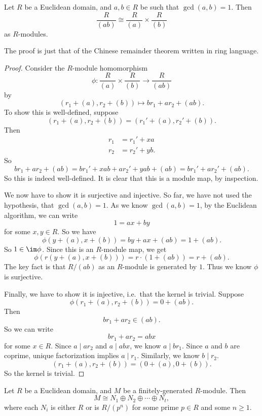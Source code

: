 \documentclass[a4paper]{article}
\begin{document}
\begin{lemma}
  Let $R$ be a Euclidean domain, and $a, b \in R$ be such that $\gcd(a, b) = 1$. Then
  \[
    \frac{R}{(ab)} \cong \frac{R}{(a)} \times \frac{R}{(b)}
  \]
  as $R$-modules.
\end{lemma}
The proof is just that of the Chinese remainder theorem written in ring language.
\begin{proof}
  Consider the $R$-module homomorphism
  \[
    \phi: \frac{R}{(a)} \times \frac{R}{(b)} \to \frac{R}{(ab)}
  \]
  by
  \[
    (r_1 + (a), r_2 + (b)) \mapsto br_1 + ar_2 + (ab).
  \]
  To show this is well-defined, suppose
  \[
    (r_1 + (a), r_2 + (b)) = (r_1' + (a), r_2' + (b)).
  \]
  Then
  \begin{align*}
    r_1 &= r_1' + xa\\
    r_2 &= r_2' + yb.
  \end{align*}
  So
  \[
    br_1 + ar_2 + (ab) = br_1' + x ab + a r_2' + yab + (ab) = br_1' + ar_2' + (ab).
  \]
  So this is indeed well-defined. It is clear that this is a module map, by inspection.

  We now have to show it is surjective and injective. So far, we have not used the hypothesis, that $\gcd(a, b) = 1$. As we know $\gcd(a, b) = 1$, by the Euclidean algorithm, we can write
  \[
    1 = ax + by
  \]
  for some $x, y \in R$. So we have
  \[
    \phi(y + (a), x + (b)) = by + ax + (ab) = 1 + (ab).
  \]
  So $1 \in \im \phi$. Since this is an $R$-module map, we get
  \[
    \phi(r (y + (a), x + (b))) = r \cdot (1 + (ab)) = r + (ab).
  \]
  The key fact is that $R/(ab)$ as an $R$-module is generated by $1$. Thus we know $\phi$ is surjective.

  Finally, we have to show it is injective, i.e.\ that the kernel is trivial. Suppose
  \[
    \phi(r_1 + (a), r_2 + (b)) = 0 + (ab).
  \]
  Then
  \[
    br_1 + a r_2 \in (ab).
  \]
  So we can write
  \[
    br_1 + ar_2 = abx
  \]
  for some $x \in R$. Since $a \mid ar_2$ and $a \mid abx$, we know $a \mid br_1$. Since $a$ and $b$ are coprime, unique factorization implies $a \mid r_1$. Similarly, we know $b \mid r_2$.
  \[
    (r_1 + (a), r_2 + (b))= (0 + (a), 0 + (b)).
  \]
  So the kernel is trivial.
\end{proof}

\begin{thm}
  Let $R$ be a Euclidean domain, and $M$ be a finitely-generated $R$-module. Then
  \[
    M \cong N_1 \oplus N_2 \oplus \cdots \oplus N_t,
  \]
  where each $N_i$ is either $R$ or is $R/(p^n)$ for some prime $p \in R$ and some $n \geq 1$.
\end{thm}
\end{document}
